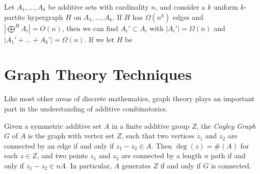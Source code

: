 Let $A_1, \dots, A_k$ be additive sets with cardinality $n$, and consider a $k$ uniform $k$-partite hypergraph $H$ on $A_1, \dots, A_k$. If $H$ has $\Omega(n^k)$ edges and $|\bigoplus^H A_i| = O(n)$, then we can find $A_i' \subset A_i$ with $|A_i'| = \Omega(n)$ and $|A_1' + \dots + A_k'| = \Omega(n)$. If we let $H$ be 





\chapter{Graph Theory Techniques}

Like most other areas of discrete mathematics, graph theory plays an important part in the understanding of additive combinatorics.

Given a symmetric additive set $A$ in a finite additive group $Z$, the \emph{Cayley Graph} $G$ of $A$ is the graph with vertex set $Z$, such that two vertices $z_1$ and $z_2$ are connected by an edge if and only if $z_1 - z_2 \in A$. Then $\deg(z) = \#(A)$ for each $z \in Z$, and two points $z_1$ and $z_2$ are connected by a length $n$ path if and only if $z_1 - z_2 \in n A$. In particular, $A$ generates $Z$ if and only if $G$ is connected.






